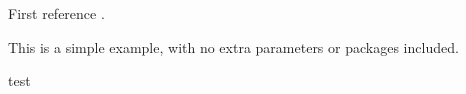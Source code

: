 \documentclass{article}
\begin{document}
First reference \cite{pentinsaari2016molecular}.

This is a simple example, with no extra parameters or packages included.

test 





\newpage 



\newpage
\end{document}

